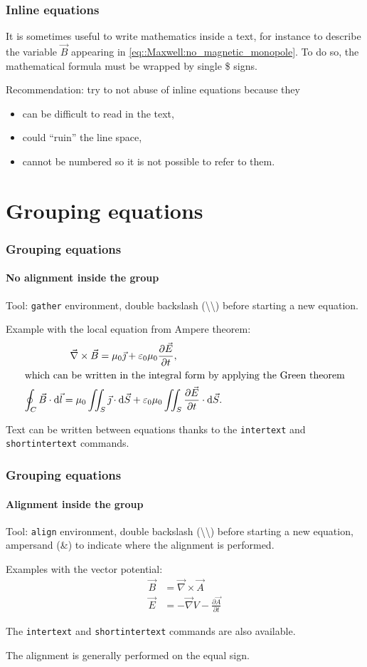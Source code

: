 \documentclass[11pt]{beamer}
\begin{document}
\begin{frame}
	\frametitle{Inline equations}
	
	It is sometimes useful to write mathematics inside a text, for instance to describe the variable $\vec{B}$ appearing in \cref{eq::Maxwell:no_magnetic_monopole}.
	To do so, the mathematical formula must be wrapped by single \$ signs.
	
	Recommendation: try to not abuse of inline equations because they
	\begin{itemize}
		\item can be difficult to read in the text,
		\item could \enquote{ruin} the line space,
		\item cannot be numbered so it is not possible to refer to them.
	\end{itemize}
\end{frame}


\section{Grouping equations}

\begin{frame}
	\frametitle{Grouping equations}
	\framesubtitle{No alignment inside the group}
	
	Tool: \texttt{gather} environment, double backslash (\textbackslash\textbackslash) before starting a new equation.
	
	Example with the local equation from Ampere theorem:
	\begin{gather}
		\vec{\nabla} \times \vec{B}
			= \mu_0 \vec{\jmath}
			+ \varepsilon_0 \mu_0 \frac{\partial \vec{E}}{\partial t}, \\
		\intertext{which can be written in the integral form by applying the Green theorem}
		\oint_{C} \vec{B} \cdot \mathrm{d} \vec{l}
			= \mu_0 \iint_S \vec{\jmath} \cdot \mathrm{d} \vec{S}
			+ \varepsilon_0 \mu_0 \iint_S \frac{\partial \vec{E}}{\partial t} \cdot \mathrm{d} \vec{S}.
	\end{gather}
	
	Text can be written between equations thanks to the \texttt{intertext} and \texttt{shortintertext} commands.
\end{frame}

\begin{frame}
	\frametitle{Grouping equations}
	\framesubtitle{Alignment inside the group}
	
	Tool: \texttt{align} environment, double backslash (\textbackslash\textbackslash) before starting a new equation, ampersand (\&) to indicate where the alignment is performed.
	
	Examples with the vector potential:
	\begin{align}
		\vec{B} &= \vec{\nabla} \times \vec{A} \\
		\vec{E} &= -\vec{\nabla} V - \frac{\partial \vec{A}}{\partial t}
	\end{align}
	
	 The \texttt{intertext} and \texttt{shortintertext} commands are also available.
	 
	 The alignment is generally performed on the equal sign.
\end{frame}
\end{document}
